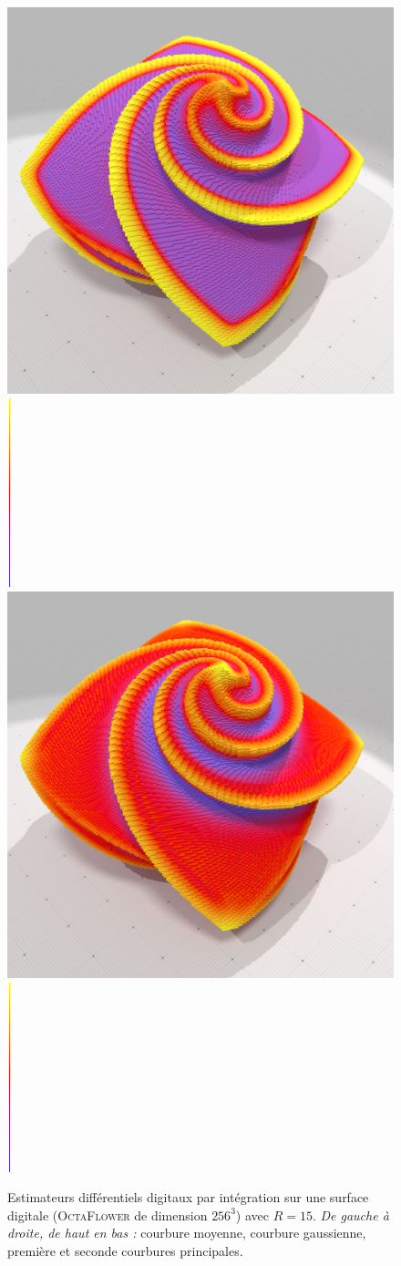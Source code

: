 \begin{figure}[ht]
\begin{center}
  \includegraphics[width=.40\linewidth]{images/Curvature/Octa256_k1_R_15_0001}
  \includegraphics[width=0.1cm,height=5.5cm]{images/YMTB6W}
  \includegraphics[width=.40\linewidth]{images/Curvature/Octa256_k2_R_15_0001}
  \includegraphics[width=0.1cm,height=5.5cm]{images/YMTB6W}\\
\end{center}\vspace{-0.5cm}
  \caption[Estimateurs différentiels digitaux par intégration sur une surface digitale (\textsc{OctaFlower} de dimension $256^3$.]{Estimateurs différentiels digitaux par intégration sur une surface digitale (\textsc{OctaFlower} de dimension $256^3$) avec $R = 15$. \emph{De gauche à droite, de haut en bas :} courbure moyenne, courbure gaussienne, première et seconde courbures principales. \label{fig:digital-II-octa}}
\end{figure}

